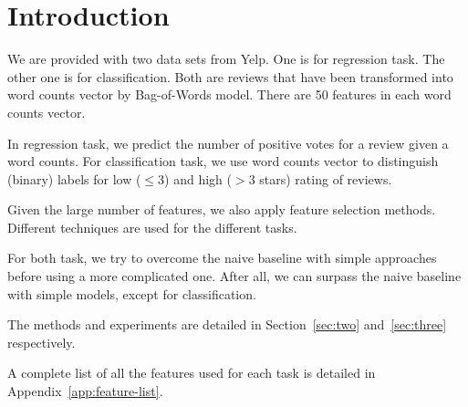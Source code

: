 \section{Introduction}
\label{sec:one}

We are provided with two data sets from Yelp. One is for regression task. The other one is for classification. Both are reviews that have been transformed into word counts vector by Bag-of-Words model. There are 50 features in each word counts vector. 

In regression task, we predict the number of positive votes for a review given a word counts. For classification task, we use word counts vector to distinguish (binary) labels for low ($\leq 3$) and high ($>3$ stars) rating of reviews.

Given the large number of features, we also apply feature selection methods. Different techniques are used for the different tasks.

For both task, we try to overcome the naive baseline with simple approaches before using a more complicated one. After all, we can surpass the naive baseline with simple models, except for classification.

The methods and experiments are detailed in Section~\ref{sec:two}
and~\ref{sec:three} respectively.

A complete list of all the features used for each task is
detailed in Appendix~\ref{app:feature-list}.

